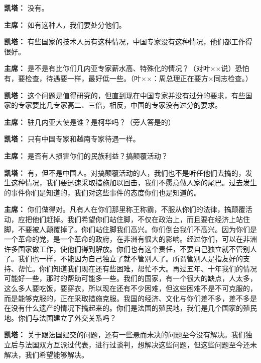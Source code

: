\begin{duihua}
\item[\textbf{凯塔：}] 没有。

\item[\textbf{主席：}] 如有这种人，我们要处分他们。

\item[\textbf{凯塔：}] 有些国家的技术人员有这种情况，中国专家没有这种情况，他们都工作得很好。

\item[\textbf{主席：}] 是不是有比你们几内亚专家薪水高、特殊化的情况？（对叶××说）恐怕有，要检查，待遇要一样，最好低一些。（叶××：周总理正在要方×同志检查。）

\item[\textbf{凯塔：}] 这个问题是值得研究的，但直到现在中国专家并没有过分的要求，有些国家的专家要比几专家高二、三倍，相反，中国的专家没有过分的要求。

\item[\textbf{主席：}] 驻几内亚大使是谁？是柯华吗？（旁人答是的）

\item[\textbf{凯塔：}] 只有中国专家和越南专家待遇一样。

\item[\textbf{主席：}] 是否有人损害你们的民族利益？搞颠覆活动？

\item[\textbf{凯塔：}] 有，但不是中国人。对搞颠覆活动的人，我们也不是听任他们去搞的，发生这种情况，我们要迅速采取措施加以回击，我们不愿意做人家的尾巴。过去发生的事件你们是知道的，我们对这些事件的态度你们也是知道的。

\item[\textbf{主席：}] 你们做得对。凡有人在你们那里称王称霸，不服从你们的法律，搞颠覆活动，应把他们赶掉。我们希望你们站住脚，不仅在政治上，而且要在经济上站住脚，不要被人颠覆掉了。你们站住脚我们高兴。你们倒台我们不高兴。因为你们是一个革命的党，是一个革命的政府，在非洲有很大的影响。经过你们，可以在非洲许多国家做工作，使他们得到解放。你们也有这个责任，不要自己独立就不管别人了。我们也一样，不能因为自己独立了就不管别人了。所谓管别人是指友好的支持、帮忙。你们知道我们现在还有些困难，帮忙不大。再过五年、十年我们的情况可能好一些，那时的帮助可能多一些。我们的国家，有一个很大的缺点，人太多，这么多人要吃饭，要穿衣，所以现在还有不少困难，但这些困难不是不可克服的，而是能够克服的，正在采取措施克服。我国的经济、文化与你们差不多，差不多是在没有什么遗产的情况下搞起来的。你们是法国的殖民地，我们是几个国家的殖民地。你们与法国建立了外交关系吗？

\item[\textbf{凯塔：}] 关于跟法国建交的问题，还有一些悬而未决的问题至今没有解决。我们独立后与法国双方互派过代表，进行过谈判，想解决这些问题，但这些问题至今还未解决，我们希望能够解决。


\end{duihua}
